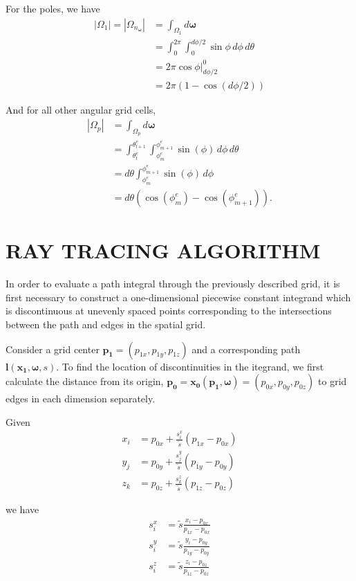 \documentclass[ms,cpyr,lof,lot]{uathesis}
\newcommand\abs[1]{\left| #1 \right|}
\renewcommand\vec\bm
\newcommand\nomega{{n_{\vec{\omega}}}}
\begin{document}
For the poles, we have
\begin{align*}
  \abs{\Omega_1} = \abs{\Omega_\nomega} &= \int_{\Omega_1} d{\vec{\omega}} \\
  &= \int_0^{2\pi}\int_0^{d\phi/2} \sin\phi\, d\phi\, d\theta \\
  &= 2\pi \cos\phi \Big|_{d\phi/2}^0 \\
  &= 2\pi(1-\cos(d\phi/2))
\end{align*}

And for all other angular grid cells,
\begin{align*}
  \abs{\Omega_p} &= \int_{\Omega_p} d{\vec{\omega}} \\
                 &= \int_{\theta_l^e}^{\theta_{l+1}^e}\int_{\phi_m^e}^{\phi_{m+1}^e} \sin(\phi)\, d\phi\, d\theta \\
                 &= d\theta \int_{\phi_m^e}^{\phi_{m+1}^e} \sin(\phi)\, d\phi \\
                 &= d\theta\left( \cos(\phi_m^e)-\cos(\phi_{m+1}^e) \right).
\end{align*}

 \chapter{RAY TRACING ALGORITHM}
\label{chap:ray_tracing}


In order to evaluate a path integral through the previously described grid, it
is first necessary to construct a one-dimensional piecewise constant integrand
which is discontinuous at unevenly spaced points corresponding to the
intersections between the path and edges in the spatial grid.

Consider a grid center $\vec{p_1} = (p_{1x},p_{1y},p_{1z})$ and a corresponding path $\vec{l}(\vec{x_1}, \vec{\omega}, s)$.
To find the location of discontinuities in the itegrand, we first calculate the
distance from its origin, $\vec{p_0} = \vec{x_0}(\vec{p_1}, \vec{\omega}) = (p_{0x}, p_{0y}, p_{0z})$ to grid edges in each dimension
separately.

Given
\begin{align}
  x_i &= p_{0x} + \frac{s_i^x}{\tilde{s}}(p_{1x}-p_{0x}) \\
  y_j &= p_{0y} + \frac{s_j^y}{\tilde{s}}(p_{1y}-p_{0y}) \\
  z_k &= p_{0z} + \frac{s_k^z}{\tilde{s}}(p_{1z}-p_{0z})
\end{align}

we have
\begin{align}
  s_i^x &= \tilde{s}\frac{x_i-p_{0x}}{p_{1x}-p_{0x}} \\
  s_i^y &= \tilde{s}\frac{y_i-p_{0y}}{p_{1y}-p_{0y}} \\
  s_i^z &= \tilde{s}\frac{z_i-p_{0z}}{p_{1z}-p_{0z}} \\
\end{align}
\end{document}
